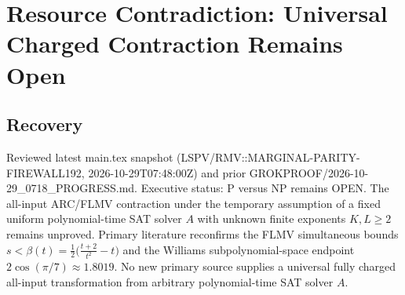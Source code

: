 
\section{Resource Contradiction: Universal Charged Contraction Remains Open}

\subsection{Recovery}
Reviewed latest main.tex snapshot (LSPV/RMV::MARGINAL-PARITY-FIREWALL192, 2026-10-29T07:48:00Z) and prior GROKPROOF/2026-10-29_0718_PROGRESS.md. Executive status: P versus NP remains OPEN. The all-input ARC/FLMV contraction under the temporary assumption of a fixed uniform polynomial-time SAT solver $A$ with unknown finite exponents $K,L\ge 2$ remains unproved. Primary literature reconfirms the FLMV simultaneous bounds $s<\beta(t)=\frac12\bigl(\frac{t+2}{t^2}-t\bigr)$ and the Williams subpolynomial-space endpoint $2\cos(\pi/7)\approx 1.8019$. No new primary source supplies a universal fully charged all-input transformation from arbitrary polynomial-time SAT solver $A$.

